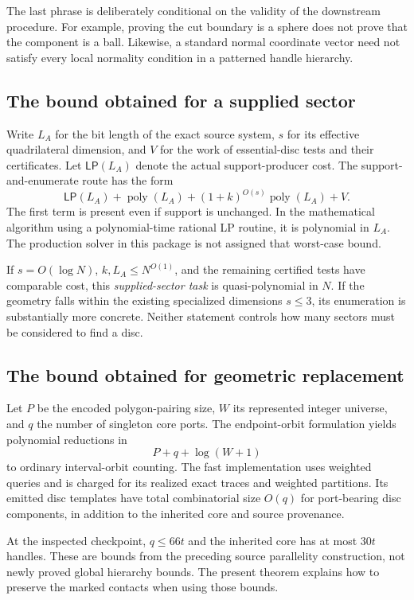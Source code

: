 \documentclass[11pt]{article}
\theoremstyle{definition}
\theoremstyle{remark}
\newcommand{\poly}{\operatorname{poly}}
\begin{document}
The last phrase is deliberately conditional on the validity of the
downstream procedure. For example, proving the cut boundary is a sphere
does not prove that the component is a ball. Likewise, a standard normal
coordinate vector need not satisfy every local normality condition in
a patterned handle hierarchy.

\subsection{The bound obtained for a supplied sector}

Write \(L_A\) for the bit length of the exact source system, \(s\) for its
effective quadrilateral dimension, and \(V\) for the work of essential-disc
tests and their certificates. Let \(\mathsf{LP}(L_A)\) denote the actual
support-producer cost. The support-and-enumerate route has the form
\[
\mathsf{LP}(L_A)+\poly(L_A)+(1+k)^{O(s)}\poly(L_A)+V.
\]
The first term is present even if support is unchanged. In the
mathematical algorithm using a polynomial-time rational LP routine,
it is polynomial in \(L_A\). The production solver in this package is
not assigned that worst-case bound.

If \(s=O(\log N)\), \(k,L_A\leq N^{O(1)}\), and the remaining certified
tests have comparable cost, this \emph{supplied-sector task} is
quasi-polynomial in \(N\). If the geometry falls within the existing
specialized dimensions \(s\leq3\), its enumeration is substantially
more concrete. Neither statement controls how many sectors must be
considered to find a disc.

\subsection{The bound obtained for geometric replacement}

Let \(P\) be the encoded polygon-pairing size, \(W\) its represented
integer universe, and \(q\) the number of singleton core ports. The
endpoint-orbit formulation yields polynomial reductions in
\[
P+q+\log(W+1)
\]
to ordinary interval-orbit counting. The fast implementation uses weighted
queries and is charged for its realized exact traces and weighted
partitions. Its emitted disc templates have total combinatorial size
\(O(q)\) for port-bearing disc components, in addition to the inherited
core and source provenance.

At the inspected checkpoint, \(q\leq66t\) and the inherited core has at
most \(30t\) handles. These are bounds from the preceding source
parallelity construction, not newly proved global hierarchy bounds.
The present theorem explains how to preserve the marked contacts when
using those bounds.
\end{document}
